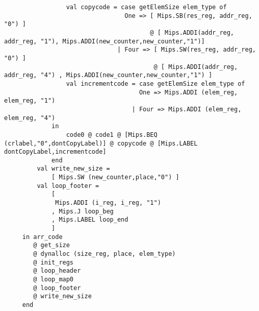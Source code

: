 \documentclass{article}
\begin{document}
\begin{verbatim}
                 val copycode = case getElemSize elem_type of
                                 One => [ Mips.SB(res_reg, addr_reg, "0") ]
                                        @ [ Mips.ADDI(addr_reg, addr_reg, "1"), Mips.ADDI(new_counter,new_counter,"1")]
                               | Four => [ Mips.SW(res_reg, addr_reg, "0") ]
                                         @ [ Mips.ADDI(addr_reg, addr_reg, "4") , Mips.ADDI(new_counter,new_counter,"1") ]
                 val incrementcode = case getElemSize elem_type of
                                     One => Mips.ADDI (elem_reg, elem_reg, "1")
                                   | Four => Mips.ADDI (elem_reg, elem_reg, "4")
             in    
                 code0 @ code1 @ [Mips.BEQ (crlabel,"0",dontCopyLabel)] @ copycode @ [Mips.LABEL dontCopyLabel,incrementcode]
             end
         val write_new_size =
             [ Mips.SW (new_counter,place,"0") ]
         val loop_footer =
             [ 
              Mips.ADDI (i_reg, i_reg, "1")
             , Mips.J loop_beg
             , Mips.LABEL loop_end
             ]
     in arr_code
        @ get_size
        @ dynalloc (size_reg, place, elem_type)
        @ init_regs
        @ loop_header
        @ loop_map0
        @ loop_footer
        @ write_new_size
     end
\end{verbatim}
\end{document}
